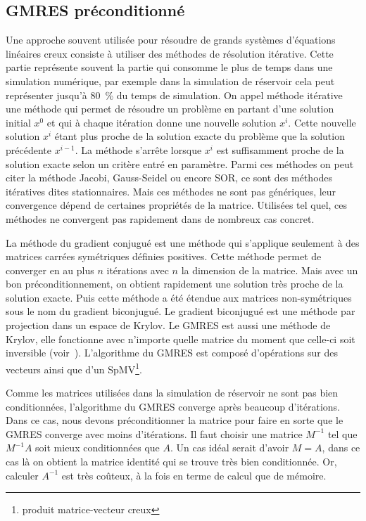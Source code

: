 \subsection{GMRES préconditionné}
Une approche souvent utilisée pour résoudre de grands systèmes d'équations linéaires creux consiste à utiliser des méthodes de résolution itérative.
%
Cette partie représente souvent la partie qui consomme le plus de temps dans une simulation numérique, par exemple dans la simulation de réservoir cela peut représenter jusqu'à 80~\% du temps de simulation.
%
On appel méthode itérative une méthode qui permet de résoudre un problème en partant d'une solution initial $x^0$ et qui à chaque itération donne une nouvelle solution $x^i$.
%
Cette nouvelle solution $x^i$ étant plus proche de la solution exacte du problème que la solution précédente $x^{i-1}$.
%
La méthode s'arrête lorsque $x^i$ est suffisamment proche de la solution exacte selon un critère entré en paramètre.
%
Parmi ces méthodes on peut citer la méthode Jacobi, Gauss-Seidel ou encore SOR, ce sont des méthodes itératives dites stationnaires.
%
Mais ces méthodes ne sont pas génériques, leur convergence dépend de certaines propriétés de la matrice.
%
Utilisées tel quel, ces méthodes ne convergent pas rapidement dans de nombreux cas concret.


La méthode du gradient conjugué est une méthode qui s'applique seulement à des matrices carrées symétriques définies positives.
%
Cette méthode permet de converger en au plus $n$ itérations avec $n$ la dimension de la matrice.
%
Mais avec un bon préconditionnement, on obtient rapidement une solution très proche de la solution exacte.
%
Puis cette méthode a été étendue aux matrices non-symétriques sous le nom du gradient biconjugué.
%
Le gradient biconjugué est une méthode par projection dans un espace de Krylov.
%
Le GMRES est aussi une méthode de Krylov, elle fonctionne avec n'importe quelle matrice du moment que celle-ci soit inversible (voir~\cite{Saad96IMSLS}).
%
L'algorithme du GMRES est composé d'opérations sur des vecteurs ainsi que d'un SpMV\footnote{produit matrice-vecteur creux}.

Comme les matrices utilisées dans la simulation de réservoir ne sont pas bien conditionnées, l'algorithme du GMRES converge après beaucoup d'itérations.
%
Dans ce cas, nous devons préconditionner la matrice pour faire en sorte que le GMRES converge avec moins d'itérations.
%
Il faut choisir une matrice $M^{-1}$ tel que $M^{-1}A$ soit mieux conditionnées que $A$.
%
Un cas idéal serait d'avoir $M=A$, dans ce cas là on obtient la matrice identité qui se trouve très bien conditionnée.
%
Or, calculer $A^{-1}$ est très coûteux, à la fois en terme de calcul que de mémoire.


